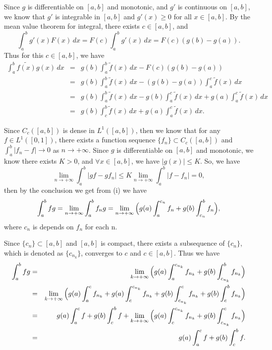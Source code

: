 \documentclass[12pt]{article}
\begin{document}
Since $g$ is differentiable on $[a, b]$ and monotonic, and $g'$ is continuous on $[a, b]$, we know that $g'$ is integrable in $[a, b]$ and $g'(x) \geq 0$ for all $x \in [a, b]$. By the mean value theorem for integral, there exists $c \in [a, b]$, and
\begin{equation*}
   \int_{a}^{b} g'(x) F(x) \, d x = F(c) \int_{a}^{b} g'(x) \, d x = F(c) (g(b) - g(a)).
\end{equation*}
Thus for this $c \in [a, b]$, we have
\begin{eqnarray*}
\int_{a}^{b} \tilde{f(x)} g(x) \, d x & = & g(b) \int_{a}^{b} \tilde{f} (x) \, d x - F(c) (g(b) - g(a)) \\
& = & g(b) \int_{a}^{b} \tilde{f} (x) \, d x - (g(b) - g(a)) \int_{a}^{c} \tilde{f} (x) \, d x \\
& = & g(b) \int_{a}^{b} \tilde{f} (x) \, d x - g(b) \int_{a}^{c} \tilde{f} (x) \, d x + g(a) \int_{a}^{c} \tilde{f} (x) \, d x  \\
& = &  g(b) \int_{c}^{b} \tilde{f} (x) \, d x + g(a) \int_{a}^{c} \tilde{f} (x) \, d x.
\end{eqnarray*}

Since $C_{c}([a, b])$ is dense in $L^{1}([a, b])$, then we know that for any $f \in L^{1}([0, 1])$, there exists a function sequence $\{f_{n}\} \subset C_{c}([a, b])$ and $\int_{a}^{b} |f_{n} - f| \to 0$ as $n \to + \infty$.
Since $g$ is differentiable on $[a,b]$ and monotonic, we know there exists $K > 0$, and $\forall x \in [a, b]$, we have $|g(x)| \leq K$. So, we have
\begin{equation*}
   \lim_{n \to + \infty} \int_{a}^{b} |g f - g f_{n}| \leq K \lim_{n \to + \infty} \int_{a}^{b}|f - f_{n}| = 0,
\end{equation*}
then by the conclusion we get from (i) we have
\begin{equation*}
   \int_{a}^{b} f g = \lim_{n \to + \infty} \int_{a}^{b} f_{n} g = \lim_{n \to + \infty} \Big{(} g(a) \int_{a}^{c_{n}} f_{n} + g(b) \int_{c_{n}}^{b} f_{n} \Big{)},
\end{equation*}
where $c_{n}$ is depends on $f_{n}$ for each n.

Since $\{c_{n}\} \subset [a, b]$ and $[a, b]$ is compact, there exists a subsequence of $\{c_{n}\}$, which is denoted as $\{c_{n_{k}}\}$, converges to $c$ and $c \in [a, b]$. Thus we have
\begin{eqnarray*}
\int_{a}^{b} f g & = & \lim_{k \to + \infty} \Big{(} g(a) \int_{a}^{c_{n_{k}}} f_{n_{k}} + g(b) \int_{c_{n_{k}}}^{b} f_{n_{k}} \Big{)} \\
& = & \lim_{k \to + \infty} \Big{(} g(a) \int_{a}^{c} f_{n_{k}} + g(a) \int_{c}^{c_{n_{k}}} f_{n_{k}} + g(b) \int_{c_{n_{k}}}^{c} f_{n_{k}} + g(b) \int_{c}^{b} f_{n_{k}} \Big{)} \\
& = &  g(a) \int_{a}^{c} f + g(b) \int_{c}^{b} f + \lim_{k \to + \infty} \Big{(} g(a) \int_{c}^{c_{n_{k}}} f_{n_{k}} +  g(b) \int_{c_{n_{k}}}^{c} f_{n_{k}} \Big{)} \\
& = & g(a) \int_{a}^{c} f + g(b) \int_{c}^{b} f.
\end{eqnarray*}
\end{document}

